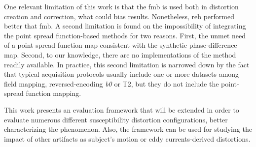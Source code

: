 One relevant limitation of this work is that the \gls*{fmb} is
used both in distortion creation and correction, what could
bias results. Nonetheless, \gls*{reb} performed better that \gls*{fmb}.
A second limitation is found on the impossibility of integrating the
point spread function-based methods for two reasons.
First, the unmet need of a point spread function map consistent
with the synthetic phase-difference map. Second, to our knowledge,
there are no implementations of the method readily available.
In practice, this second limitation is narrowed down by the
fact that typical acquisition protocols usually include one or more
datasets among field mapping, reversed-encoding \textit{b0} or T2,
but they do not include the point-spread function mapping.

This work presents an evaluation framework that will be extended
in order to evaluate numerous different susceptibility distortion
configurations, better characterizing the phenomenon. Also, the
framework can be used for studying the impact of other artifacts
as subject's motion or eddy currents-derived distortions.